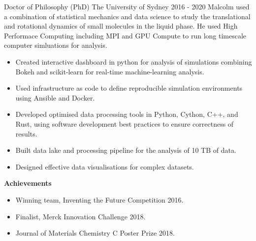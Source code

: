 

\begin{cventry}
  {Doctor of Philosophy (PhD)} %
  {The University of Sydney} %
  {} %
  {2016 - 2020} %
  Malcolm used a combination of statistical mechanics and data science to
  study the translational and rotational dynamics
  of small molecules in the liquid phase.
  He used High Performace Computing
  including MPI and GPU Compute
  to run long timescale computer simluations for analysis.
  \begin{itemize}
    \item Created interactive dashboard in python for analysis of simulations
      combining Bokeh and scikit-learn for real-time machine-learning analysis.
    \item Used infrastructure as code to define reproducible simulation environments
      using Ansible and Docker.
    \item Developed optimised data processing tools in Python, Cython, C++, and Rust,
      using software development best practices to ensure correctness of results.
    \item Built data lake and processing pipeline for the analysis of 10 TB of data.
    \item Designed effective data visualisations for complex datasets.
  \end{itemize}
  \textbf{Achievements}
  \begin{itemize}
    \item Winning team, Inventing the Future Competition 2016.
    \item Finalist, Merck Innovation Challenge 2018.
    \item Journal of Materials Chemistry C Poster Prize 2018.
  \end{itemize}
\end{cventry}



